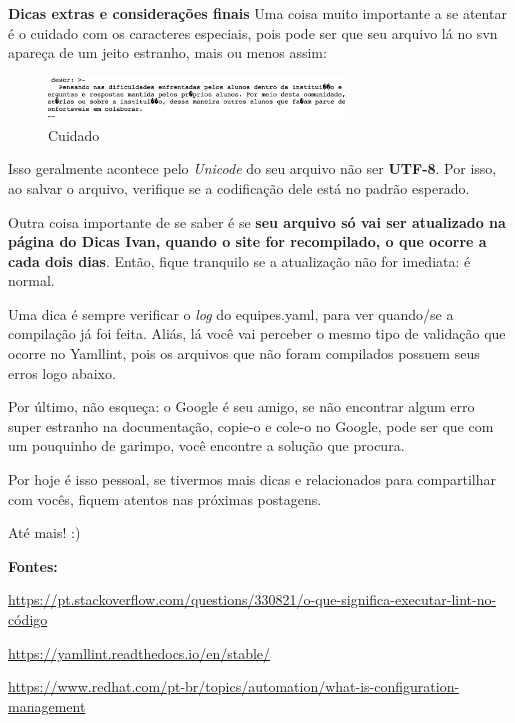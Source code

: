 \textbf{Dicas extras e considerações finais}
Uma coisa muito importante a se atentar é o cuidado com os caracteres especiais, pois pode ser que seu arquivo lá no \acs{svn} apareça de um jeito estranho, mais ou menos assim:

\begin{figure}[htb]
        \centering
        \caption{Cuidado}
        \includegraphics[width=0.7\textwidth]{anexos/Imagens_Blog/cuidados.png}
        \end{figure}
        \FloatBarrier

Isso geralmente acontece pelo \textit{Unicode} do seu arquivo não ser \textbf{UTF-8}. Por isso, ao salvar o arquivo, verifique se a codificação dele está no padrão esperado.

Outra coisa importante de se saber é se \textbf{seu arquivo só vai ser atualizado na página do Dicas Ivan, quando o site for recompilado, o que ocorre a cada dois dias}. Então, fique tranquilo se a atualização não for imediata: é normal. 

Uma dica é sempre verificar o \textit{log} do equipes.yaml, para ver quando/se a compilação já foi feita. Aliás, lá você vai perceber o mesmo tipo de validação que ocorre no \gls{Yamllint}, pois os arquivos que não foram compilados possuem seus erros logo abaixo.

Por último, não esqueça: o Google é seu amigo, se não encontrar algum erro super estranho na documentação, copie-o e cole-o no Google, pode ser que com um pouquinho de garimpo, você encontre a solução que procura.

Por hoje é isso pessoal, se tivermos mais dicas e relacionados para compartilhar com vocês, fiquem atentos nas próximas postagens.

Até mais! :) 

\textbf{Fontes:}

\noindent\href{https://pt.stackoverflow.com/questions/330821/o-que-significa-executar-lint-no-código}{https://pt.stackoverflow.com/questions/330821/o-que-significa-executar-lint-no-código}

\noindent\href{https://yamllint.readthedocs.io/en/stable/}{https://yamllint.readthedocs.io/en/stable/}

\noindent\href{https://www.redhat.com/pt-br/topics/automation/what-is-configuration-management}{https://www.redhat.com/pt-br/topics/automation/what-is-configuration-management}

